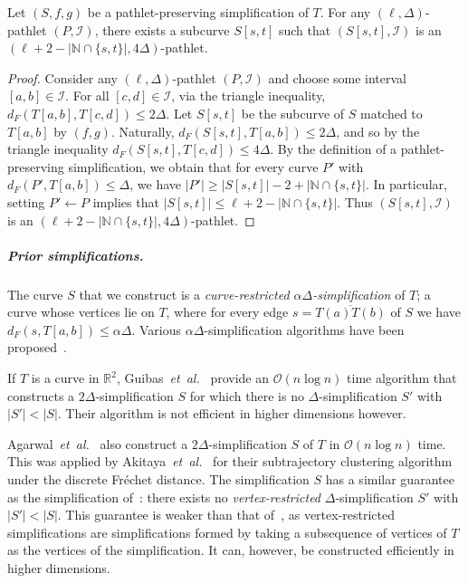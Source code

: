 \documentclass[a4paper,UKenglish,cleveref,thm-restate,notab]{lipics-v2021}
\makeatletter
\newcommand{\etal}{\textit{et~al.\@}\xspace}
\newcommand{\f}{Fr\'echet\xspace}
\newcommand{\dF}{\ensuremath{d_F}}
\newcommand{\bigO}{\mathcal{O}}
\newcommand{\N}{\mathbb{N}}
\newcommand{\I}{\mathcal{I}}
\makeatother
\begin{document}
    \begin{theorem}
        \label{thm:property_S}
        Let $(S, f, g)$ be a pathlet-preserving simplification of $T$. 
        For any $(\ell, \Delta)$-pathlet $(P, \I)$, there exists a subcurve $S[s, t]$ such that $(S[s, t], \I)$ is an $(\ell +2 - |\N \cap \{s, t\}|, 4\Delta)$-pathlet.
    \end{theorem}
    \begin{proof}
            Consider any $(\ell, \Delta)$-pathlet $(P, \I)$ and choose some interval $[a, b] \in \I$. 
            For all $[c, d] \in \I$, via the triangle inequality, $\dF(T[a, b], T[c, d]) \leq 2 \Delta$.
            Let $S[s, t]$ be the subcurve of $S$ matched to $T[a, b]$ by $(f, g)$.
            Naturally, $\dF(S[s, t], T[a, b]) \leq 2\Delta$, and so by the triangle inequality $\dF(S[s, t], T[c, d]) \leq 4\Delta$.
            By the definition of a pathlet-preserving simplification, we obtain that for every curve $P'$ with $\dF(P', T[a, b]) \leq \Delta$, we have $|P'| \geq |S[s, t]| - 2 + |\N \cap \{s, t\}|$.
            In particular, setting $P' \gets P$ implies that $|S[s, t]| \leq \ell + 2 - |\N \cap \{s, t\}|$.
            Thus $(S[s, t], \I)$ is an $(\ell + 2 - |\N \cap \{s, t\}|, 4\Delta)$-pathlet.
    \end{proof}
        
\subparagraph*{Prior simplifications.}
    The curve $S$ that we construct is a \emph{curve-restricted $\alpha \Delta$-simplification} of $T$; a curve whose vertices lie on $T$, where for every edge $s = \overline{T(a) T(b)}$ of $S$ we have $\dF(s, T[a, b]) \leq \alpha \Delta$. 
    Various $\alpha \Delta$-simplification algorithms have been proposed~\cite{guibas93minimum_link, agarwal_near-linear_2005, de_berg_fast_2013, van2018global}.
    
    If $T$ is a curve in $\mathbb{R}^2$, Guibas~\etal~\cite{guibas93minimum_link} provide an $\bigO(n \log n)$ time algorithm that constructs a $2 \Delta$-simplification $S$ for which there is no $\Delta$-simplification $S'$ with $|S'| < |S|$.
    Their algorithm is not efficient in higher dimensions however.
    
    Agarwal~\etal~\cite{agarwal_near-linear_2005} also construct a $2\Delta$-simplification $S$ of $T$ in $\bigO(n \log n)$ time. This was applied by Akitaya~\etal~\cite{bruning_subtrajectory_2023} for their subtrajectory clustering algorithm under the discrete \f distance. 
    The simplification $S$ has a similar guarantee as the simplification of~\cite{guibas93minimum_link}: there exists no \emph{vertex-restricted} $\Delta$-simplification $S'$ with $|S'| < |S|$.
    This guarantee is weaker than that of~\cite{guibas93minimum_link}, as vertex-restricted simplifications are simplifications formed by taking a subsequence of vertices of $T$ as the vertices of the simplification.
    It can, however, be constructed efficiently in higher dimensions.
    
\end{document}
